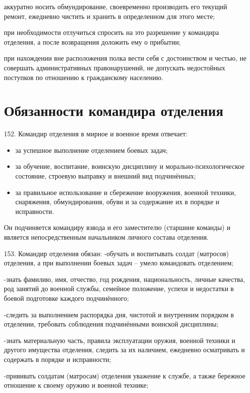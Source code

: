 \documentclass[12pt,a4paper]{report}
\begin{document}
аккуратно носить обмундирование, своевременно производить его текущий ремонт, ежедневно чистить и хранить в определенном для этого месте;

при необходимости отлучиться спросить на это разрешение у командира отделения, а после возвращения доложить ему о прибытии;

при нахождении вне расположения полка вести себя с достоинством и честью, не совершать административных правонарушений, не допускать недостойных поступков по отношению к гражданскому населению.

\section{Обязанности командира отделения}

152. Командир  отделения  в мирное  и  военное  время  отвечает:
\begin{itemize}
\item за  успешное  выполнение  отделением  боевых  задач;
\item за  обучение,  воспитание,  воинскую  дисциплину  и  морально-психологическое  состояние, строевую  выправку  и  внешний  вид  подчинённых;
\item за  правильное  использование  и  сбережение  вооружения,  военной  техники, снаряжения,  обмундирования,  обуви  и за  содержание  их  в  порядке  и  исправности.
\end{itemize}
Он  подчиняется  командиру  взвода  и  его  заместителю (старшине  команды)  и  является  непосредственным  начальником  личного  состава  отделения.
 
153. Командир  отделения  обязан:
-обучать  и  воспитывать  солдат (матросов)  отделения, а  при  выполнении  боевых  задач – умело командовать  отделением;

-знать  фамилию,  имя,  отчество,  год  рождения,  национальность,  личные качества,  род  занятий  до  военной  службы,  семейное  положение, успехи  и недостатки  в  боевой  подготовке  каждого  подчинённого;

-следить  за  выполнением  распорядка  дня,  чистотой  и  внутренним  порядком  в отделении,  требовать  соблюдения  подчинёнными  воинской  дисциплины;

-знать  материальную  часть,  правила  эксплуатации  оружия,  военной  техники  и  другого  имущества  отделения,  следить  за  их  наличием,  ежедневно  осматривать  и  содержать  в  порядке  и  исправности;

-прививать  солдатам (матросам)  отделения  уважение  к службе, а  также  бережное  отношение к  своему  оружию  и  военной  технике;
\end{document}
